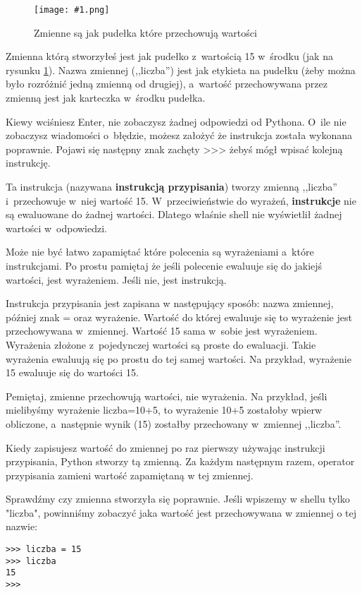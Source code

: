 \documentclass{book}
\newcommand{\img}[3]{
\begin{figure}
\centerline{
	\texttt{[image: \#1.png]}
}
\caption{#2}
\label{#1}
\end{figure}
}
\begin{document}
\img{idle-zmienna}{Zmienne są jak pudełka które przechowują wartości}{4cm}

Zmienna którą stworzyłeś jest jak pudełko z~wartością 15 w~środku (jak na rysunku \ref{idle-zmienna}). Nazwa zmiennej (,,liczba'') jest jak etykieta na pudełku (żeby można było rozróżnić jedną zmienną od drugiej), a~wartość przechowywana przez zmienną jest jak karteczka w~środku pudełka.

Kiewy wciśniesz Enter, nie zobaczysz żadnej odpowiedzi od Pythona. O~ile nie zobaczysz wiadomości o~błędzie, możesz założyć że instrukcja została wykonana poprawnie. Pojawi się następny znak zachęty >>> żebyś mógł wpisać kolejną instrukcję.

Ta instrukcja (nazywana {\bf instrukcją przypisania}) tworzy zmienną ,,liczba'' i~przechowuje w~niej wartość 15. W~przeciwieństwie do wyrażeń, {\bf instrukcje} nie są ewaluowane do żadnej wartości. Dlatego właśnie shell nie wyświetlił żadnej wartości w~odpowiedzi.

Może nie być łatwo zapamiętać które polecenia są wyrażeniami a~które instrukcjami. Po prostu pamiętaj że jeśli polecenie ewaluuje się do jakiejś wartości, jest wyrażeniem. Jeśli nie, jest instrukcją.

Instrukcja przypisania jest zapisana w następujący sposób: nazwa zmiennej, później znak = oraz wyrażenie. Wartość do której ewaluuje się to wyrażenie jest przechowywana w~zmiennej. Wartość 15 sama w~sobie jest wyrażeniem. Wyrażenia złożone z~pojedynczej wartości są proste do ewaluacji. Takie wyrażenia ewaluują się po prostu do tej samej wartości. Na przykład, wyrażenie 15 ewaluuje się do wartości 15.

Pemiętaj, zmienne przechowują wartości, nie wyrażenia. Na przykład, jeśli mielibyśmy wyrażenie liczba=10+5, to wyrażenie 10+5 zostałoby wpierw obliczone, a~następnie wynik (15) zostałby przechowany w~zmiennej ,,liczba''.

Kiedy zapisujesz wartość do zmiennej po raz pierwszy używając instrukcji przypisania, Python stworzy tą zmienną. Za każdym następnym razem, operator przypisania zamieni wartość zapamiętaną w tej zmiennej.

Sprawdźmy czy zmienna stworzyła się poprawnie. Jeśli wpiszemy w shellu tylko "liczba", powinniśmy zobaczyć jaka wartość jest przechowywana w zmiennej o tej nazwie:

\begin{lstlisting}
>>> liczba = 15
>>> liczba
15
>>> 
\end{lstlisting}
\end{document}
